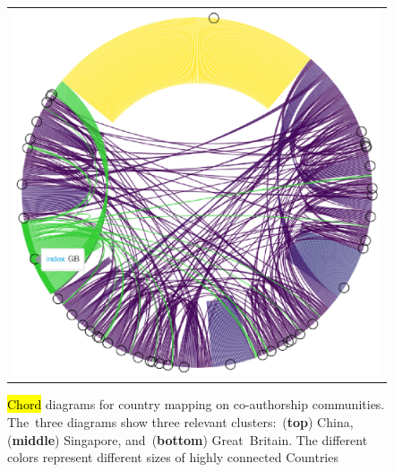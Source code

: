 \documentclass[jmse,review,accept,pdftex,moreauthors]{Definitions/mdpi}
\begin{document}
\begin{figure}[H]
\begin{tabular}{l}
	\includegraphics[height=0.3\textheight, keepaspectratio]{pics/coauthorship_country_chord_3.eps}\\
	\end{tabular}
	\caption{\hl{Chord} %
 diagrams for country mapping on co-authorship communities. The~three diagrams show three relevant clusters:~(\textbf{top}) China, (\textbf{middle}) Singapore, and~(\textbf{bottom}) Great~Britain. The different colors represent different sizes of highly connected Countries}\label{fig:fig7}
\end{figure}
\end{document}
